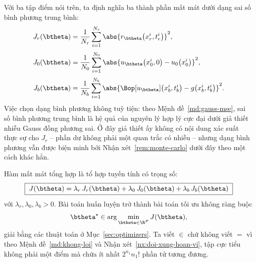 Với ba tập điểm nói trên, ta định nghĩa ba thành phần mất mát dưới dạng sai số
bình phương trung bình:
\begin{align}
J_{r}(\btheta)
  &= \frac{1}{N_{r}} \sum_{i=1}^{N_{r}}
     \abs{r_{\btheta}\!\left(x_{r}^{i}, t_{r}^{i}\right)}^{2},
     \label{eq:loss-r}\\[2pt]
J_{0}(\btheta)
  &= \frac{1}{N_{0}} \sum_{i=1}^{N_{0}}
     \abs{u_{\btheta}\!\left(x_{0}^{i}, 0\right)
          - u_{0}\!\left(x_{0}^{i}\right)}^{2},
     \label{eq:loss-0}\\[2pt]
J_{b}(\btheta)
  &= \frac{1}{N_{b}} \sum_{i=1}^{N_{b}}
     \abs{\Bop\!\left[u_{\btheta}\right]\!\left(x_{b}^{i}, t_{b}^{i}\right)
          - g\!\left(x_{b}^{i}, t_{b}^{i}\right)}^{2}.
     \label{eq:loss-b}
\end{align}
Việc chọn dạng bình phương không tuỳ tiện: theo
Mệnh đề~\ref{md:gauss-mse}, sai số bình phương trung bình là hệ quả của nguyên lý
hợp lý cực đại dưới giả thiết nhiễu Gauss đồng phương sai. Ở đây giả thiết ấy
không có nội dung xác suất thực sự cho $J_r$ -- phần dư không phải một quan trắc
có nhiễu -- nhưng dạng bình phương vẫn được biện minh bởi
Nhận xét~\ref{rem:monte-carlo} dưới đây theo một cách khác hẳn.
 
Hàm mất mát tổng hợp là tổ hợp tuyến tính có trọng số:
\begin{equation}
\boxed{\;
J(\btheta)
= \lambda_{r}\, J_{r}(\btheta)
+ \lambda_{0}\, J_{0}(\btheta)
+ \lambda_{b}\, J_{b}(\btheta)
\;}
\label{eq:total-loss}
\end{equation}
với $\lambda_{r}, \lambda_{0}, \lambda_{b} > 0$. Bài toán huấn luyện trở thành bài
toán tối ưu không ràng buộc
\begin{equation}
\btheta^{\star} \in \arg\min_{\btheta \in \R^{P}} J(\btheta),
\label{eq:opt-problem}
\end{equation}
giải bằng các thuật toán ở Mục~\ref{sec:optimizers}. Ta viết $\in$ chứ không viết
$=$ vì theo Mệnh đề~\ref{md:khong-loi} và Nhận xét~\ref{nx:doi-xung-hoan-vi}, tập
cực tiểu không phải một điểm mà chứa ít nhất $2^{n_1}n_1!$ phần tử tương đương.
 
